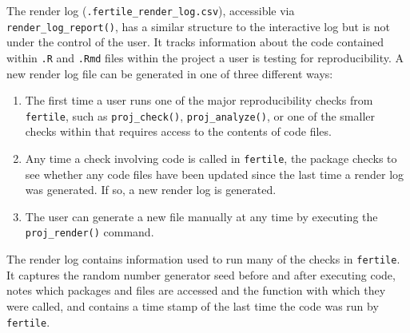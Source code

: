 \documentclass[12pt,twoside]{reedthesis}
\begin{document}
The render log (\texttt{.fertile\_render\_log.csv}), accessible via \texttt{render\_log\_report()}, has a similar structure to the interactive log but is not under the control of the user. It tracks information about the code contained within \texttt{.R} and \texttt{.Rmd} files within the project a user is testing for reproducibility. A new render log file can be generated in one of three different ways:
\begin{enumerate}
\def\labelenumi{\arabic{enumi}.}
\item
  The first time a user runs one of the major reproducibility checks from \texttt{fertile}, such as \texttt{proj\_check()}, \texttt{proj\_analyze()}, or one of the smaller checks within that requires access to the contents of code files.
\item
  Any time a check involving code is called in \texttt{fertile}, the package checks to see whether any code files have been updated since the last time a render log was generated. If so, a new render log is generated.
\item
  The user can generate a new file manually at any time by executing the \texttt{proj\_render()} command.
\end{enumerate}
The render log contains information used to run many of the checks in \texttt{fertile}. It captures the random number generator seed before and after executing code, notes which packages and files are accessed and the function with which they were called, and contains a time stamp of the last time the code was run by \texttt{fertile}.
\end{document}
